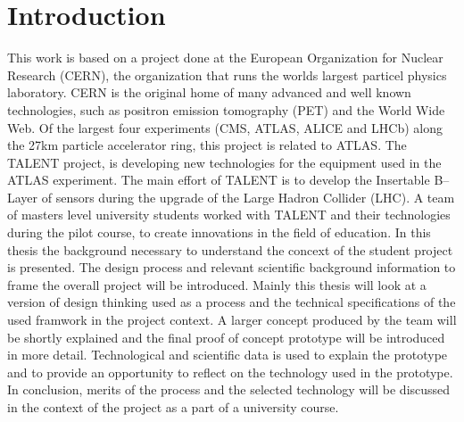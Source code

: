 \documentclass[english,12pt,a4paper,pdftex]{article}
\begin{document}
\section{Introduction}

\thispagestyle{empty}

This work is based on a project done at the European Organization for Nuclear Research (CERN), the organization that runs the worlds largest particel physics laboratory. CERN is the original home of many advanced and well known technologies, such as positron emission tomography (PET) and the World Wide Web. Of the largest four experiments (CMS, ATLAS, ALICE and LHCb) along the 27km particle accelerator ring, this project is related to ATLAS.
The TALENT project, is developing new technologies for the equipment used in the ATLAS experiment. The main effort of TALENT is to develop the Insertable B--Layer of sensors during the upgrade of the Large Hadron Collider (LHC). A team of masters level university students worked with TALENT and their technologies during the pilot course, to create innovations in the field of education.
In this thesis the background necessary to understand the concext of the student project is presented. The design process and relevant scientific background information to frame the overall project will be introduced. Mainly this thesis will look at a version of design thinking used as a process and the technical specifications of the used framwork in the project context. A larger concept produced by the team will be shortly explained and the final proof of concept prototype will be introduced in more detail. Technological and scientific data is used to explain the prototype and to provide an opportunity to reflect on the technology used in the prototype. In conclusion, merits of the process and the selected technology will be discussed in the context of the project as a part of a university course.

\end{document}
